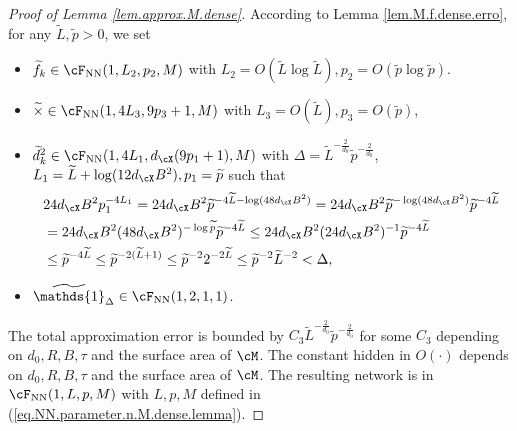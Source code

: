 \documentclass[11pt]{article} %
\begin{document}
\begin{proof}[Proof of Lemma \ref{lem.approx.M.dense}]
	
	According to Lemma \ref{lem.M.f.dense.erro}, for any $\widetilde{L},\widetilde{p}>0$, we set 
	\begin{itemize}
		\item $\widetilde{f}_k\in \cF_{\rm NN}(1,L_2,p_2,M)$ with $L_2=O\left(\widetilde{L}\log \widetilde{L}\right), p_2=O\left(\widetilde{p}\log \widetilde{p}\right)$.
		\item $\widetilde{\times}\in \cF_{\rm NN}(1,4L_3,9p_3+1,M)$ with $L_3=O\left(\widetilde{L}\right), p_3=O\left( \widetilde{p}\right)$,
		\item $\widetilde{d}_k^2\in \cF_{\rm NN}(1,4L_1,d_{\cX}(9p_1+1),M)$ with $\Delta =\widetilde{L}^{-\frac{2}{d_0}}\widetilde{p}^{-\frac{2}{d_0}}$, $L_1=\widetilde{L}+\log (12d_{\cX}B^2),p_1=\widetilde{p}$ such that
		\begin{align}
			&24d_{\cX}B^2p_1^{-4L_1}=24d_{\cX}B^2\widetilde{p}^{-4\widetilde{L}-\log (48d_{\cX}B^2)}= 24d_{\cX}B^2\widetilde{p}^{-\log (48d_{\cX}B^2)}\widetilde{p}^{-4\widetilde{L}} \nonumber\\
			&= 24d_{\cX}B^2(48d_{\cX}B^2)^{-\log \widetilde{p}}\widetilde{p}^{-4\widetilde{L}}\leq  24d_{\cX}B^2(24d_{\cX}B^2)^{-1}\widetilde{p}^{-4\widetilde{L}}\nonumber\\
			&\leq \widetilde{p}^{-4\widetilde{L}}\leq \widetilde{p}^{-2(\widetilde{L}+1)}\leq \widetilde{p}^{-2}2^{-2\widetilde{L}}\leq \widetilde{p}^{-2}\widetilde{L}^{-2}<\Delta,
		\end{align}
		
		\item $\widetilde{\mathds{1}}_{\Delta}\in \cF_{\rm NN}(1,2,1,1)$.
	\end{itemize}
	The total approximation error is bounded by $C_3\widetilde{L}^{-\frac{2}{d_0}}\widetilde{p}^{-\frac{2}{d_0}}$ for some $C_3$ depending on $d_0,R,B, \tau$ and the surface area of $\cM$. The constant hidden in $O(\cdot)$ depends on $d_0,R,B, \tau$ and the surface area of $\cM$. The resulting network is in $\cF_{\rm NN}(1,L,p,M)$ with $L,p,M$ defined in (\ref{eq.NN.parameter.n.M.dense.lemma}).
	
	
	
\end{proof}
\end{document}
